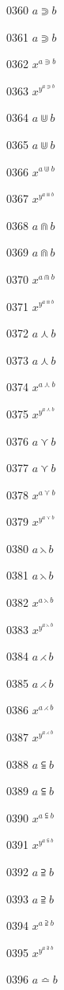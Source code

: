 \documentclass{article}
\begin{document}
0360 $a\Supset b$\par
0361 $\displaystyle a\Supset b$\par
0362 $x^{a\Supset b}$\par
0363 $x^{y^{a\Supset b}}$\par
0364 $a\Cup b$\par
0365 $\displaystyle a\Cup b$\par
0366 $x^{a\Cup b}$\par
0367 $x^{y^{a\Cup b}}$\par
0368 $a\Cap b$\par
0369 $\displaystyle a\Cap b$\par
0370 $x^{a\Cap b}$\par
0371 $x^{y^{a\Cap b}}$\par
0372 $a\curlywedge b$\par
0373 $\displaystyle a\curlywedge b$\par
0374 $x^{a\curlywedge b}$\par
0375 $x^{y^{a\curlywedge b}}$\par
0376 $a\curlyvee b$\par
0377 $\displaystyle a\curlyvee b$\par
0378 $x^{a\curlyvee b}$\par
0379 $x^{y^{a\curlyvee b}}$\par
0380 $a\leftthreetimes b$\par
0381 $\displaystyle a\leftthreetimes b$\par
0382 $x^{a\leftthreetimes b}$\par
0383 $x^{y^{a\leftthreetimes b}}$\par
0384 $a\rightthreetimes b$\par
0385 $\displaystyle a\rightthreetimes b$\par
0386 $x^{a\rightthreetimes b}$\par
0387 $x^{y^{a\rightthreetimes b}}$\par
0388 $a\subseteqq b$\par
0389 $\displaystyle a\subseteqq b$\par
0390 $x^{a\subseteqq b}$\par
0391 $x^{y^{a\subseteqq b}}$\par
0392 $a\supseteqq b$\par
0393 $\displaystyle a\supseteqq b$\par
0394 $x^{a\supseteqq b}$\par
0395 $x^{y^{a\supseteqq b}}$\par
0396 $a\bumpeq b$\par
\end{document}
